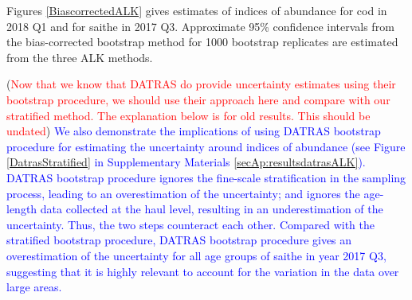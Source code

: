 \documentclass[a4paper 12pt]{article}
\numberwithin{equation}{section}
\newcommand{\ed}[1]{\textcolor{red}{#1}}
\newcommand{\nat}[1]{\textcolor{blue}{#1}}
\begin{document}
Figures \ref{BiascorrectedALK} gives estimates of indices of abundance for cod in  2018 Q1 and for saithe in  2017 Q3. Approximate 95\% confidence intervals from the bias-corrected bootstrap method for 1000 bootstrap replicates are estimated from the three ALK methods. 

(\ed{Now that we know that DATRAS do provide uncertainty estimates using their bootstrap procedure, we should use their approach here and compare with our stratified method. The explanation below is for old results. This should be undated})
\nat{We also demonstrate the implications of using DATRAS bootstrap procedure for estimating the uncertainty around indices of abundance (see Figure \ref{DatrasStratified} in Supplementary Materials \ref{secAp:resultsdatrasALK}). DATRAS bootstrap procedure ignores the fine-scale stratification in the sampling process, leading to an overestimation of the uncertainty; and ignores the age-length data collected at the haul level, resulting in an underestimation of the uncertainty. Thus, the two steps counteract each other. Compared with the stratified bootstrap procedure, DATRAS bootstrap procedure gives an overestimation of the uncertainty for all age groups of saithe in year 2017 Q3, suggesting that it is highly relevant to account for the variation in the data over large areas.} 

\end{document}
